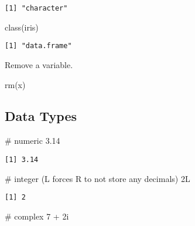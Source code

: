 \documentclass[
  letterpaper,
  DIV=11,
  numbers=noendperiod]{scrartcl}
\newenvironment{Shaded}{\begin{snugshade}}{\end{snugshade}}
\newcommand{\CommentTok}[1]{\textcolor[rgb]{0.37,0.37,0.37}{#1}}
\newcommand{\DecValTok}[1]{\textcolor[rgb]{0.68,0.00,0.00}{#1}}
\newcommand{\FloatTok}[1]{\textcolor[rgb]{0.68,0.00,0.00}{#1}}
\newcommand{\FunctionTok}[1]{\textcolor[rgb]{0.28,0.35,0.67}{#1}}
\newcommand{\NormalTok}[1]{\textcolor[rgb]{0.00,0.23,0.31}{#1}}
\newcommand{\SpecialCharTok}[1]{\textcolor[rgb]{0.37,0.37,0.37}{#1}}
\begin{document}
\begin{verbatim}
[1] "character"
\end{verbatim}

\begin{Shaded}
\begin{Highlighting}[]
\FunctionTok{class}\NormalTok{(iris)}
\end{Highlighting}
\end{Shaded}

\begin{verbatim}
[1] "data.frame"
\end{verbatim}

Remove a variable.

\begin{Shaded}
\begin{Highlighting}[]
\FunctionTok{rm}\NormalTok{(x)}
\end{Highlighting}
\end{Shaded}

\subsection{Data Types}\label{data-types}

\begin{Shaded}
\begin{Highlighting}[]
\CommentTok{\# numeric}
\FloatTok{3.14}
\end{Highlighting}
\end{Shaded}

\begin{verbatim}
[1] 3.14
\end{verbatim}

\begin{Shaded}
\begin{Highlighting}[]
\CommentTok{\# integer (L forces R to not store any decimals)}
\DecValTok{2}\NormalTok{L}
\end{Highlighting}
\end{Shaded}

\begin{verbatim}
[1] 2
\end{verbatim}

\begin{Shaded}
\begin{Highlighting}[]
\CommentTok{\# complex}
\DecValTok{7} \SpecialCharTok{+} \DecValTok{2}\NormalTok{i}
\end{Highlighting}
\end{Shaded}
\end{document}
